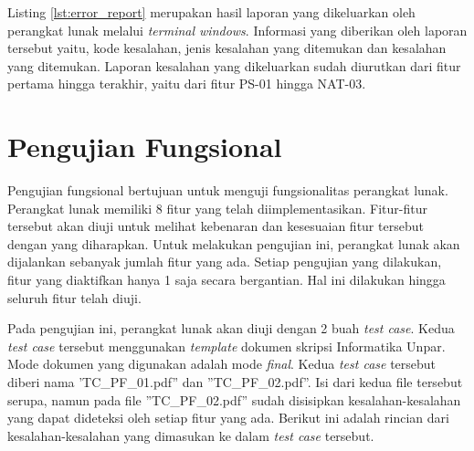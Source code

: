 Listing \ref{lst:error_report} merupakan hasil laporan yang dikeluarkan oleh perangkat lunak melalui \textit{terminal windows}. Informasi yang diberikan oleh laporan tersebut yaitu, kode kesalahan, jenis kesalahan yang ditemukan dan kesalahan yang ditemukan. Laporan kesalahan yang dikeluarkan sudah diurutkan dari fitur pertama hingga terakhir, yaitu dari fitur PS-01 hingga NAT-03.

\section{Pengujian Fungsional}
Pengujian fungsional bertujuan untuk menguji fungsionalitas perangkat lunak. Perangkat lunak memiliki 8 fitur yang telah diimplementasikan. Fitur-fitur tersebut akan diuji untuk melihat kebenaran dan kesesuaian fitur tersebut dengan yang diharapkan. Untuk melakukan pengujian ini, perangkat lunak akan dijalankan sebanyak jumlah fitur yang ada. Setiap pengujian yang dilakukan, fitur yang diaktifkan hanya 1 saja secara bergantian. Hal ini dilakukan hingga seluruh fitur telah diuji.

Pada pengujian ini, perangkat lunak akan diuji dengan 2 buah \textit{test case}. Kedua \textit{test case} tersebut menggunakan \textit{template} dokumen skripsi Informatika Unpar. Mode dokumen yang digunakan adalah mode \textit{final}. Kedua \textit{test case} tersebut diberi nama 'TC\_PF\_01.pdf'' dan ''TC\_PF\_02.pdf''. Isi dari kedua file tersebut serupa, namun pada file ''TC\_PF\_02.pdf'' sudah disisipkan kesalahan-kesalahan yang dapat dideteksi oleh setiap fitur yang ada. Berikut ini adalah rincian dari kesalahan-kesalahan yang dimasukan ke dalam \textit{test case} tersebut.

